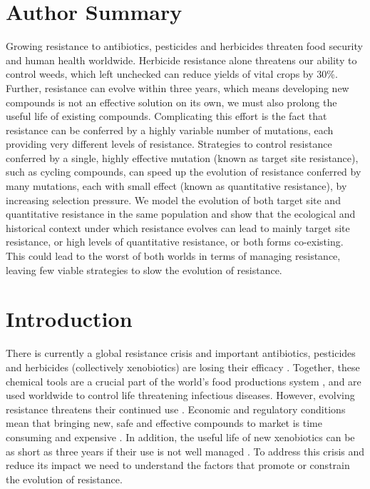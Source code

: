\documentclass[10pt,letterpaper]{article}
\begin{document}
\section*{Author Summary}
Growing resistance to antibiotics, pesticides and herbicides threaten food security and human health worldwide. Herbicide resistance alone threatens our ability to control weeds, which left unchecked can reduce yields of vital crops by 30\%. Further, resistance can evolve within three years, which means developing new compounds is not an effective solution on its own, we must also prolong the useful life of existing compounds. Complicating this effort is the fact that resistance can be conferred by a highly variable number of mutations, each providing very different levels of resistance. Strategies to control resistance conferred by a single, highly effective mutation (known as target site resistance), such as cycling compounds, can speed up the evolution of resistance conferred by many mutations, each with small effect (known as quantitative resistance), by increasing selection pressure. We model the evolution of both target site and quantitative resistance in the same population and show that the ecological and historical context under which resistance evolves can lead to mainly target site resistance, or high levels of quantitative resistance, or both forms co-existing. This could lead to the worst of both worlds in terms of managing resistance, leaving few viable strategies to slow the evolution of resistance.      

\linenumbers

\section*{Introduction}
There is currently a global resistance crisis \cite{Serv2013, Ross2014} and important antibiotics, pesticides and herbicides (collectively xenobiotics) are losing their efficacy \cite{Palu2001}. Together, these chemical tools are a crucial part of the world's food productions system \cite{Duke2012}, and are used worldwide to control life threatening infectious diseases. However, evolving resistance threatens their continued use \cite{Barb2011, Nkya2013}. Economic and regulatory conditions mean that bringing new, safe and effective compounds to market is time consuming and expensive \cite{Duke2012}. In addition, the useful life of new xenobiotics can be as short as three years if their use is not well managed \cite{Palu2001, Duke2012}. To address this crisis and reduce its impact we need to understand the factors that promote or constrain the evolution of resistance. 
\end{document}
